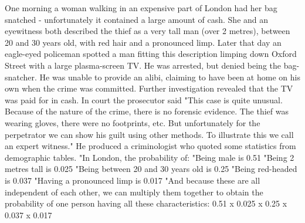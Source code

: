 One morning a woman walking in an expensive part of London had her bag snatched - unfortunately it contained a large amount of cash. She and an eyewitness both described the thief as a very tall man (over 2 metres), between 20 and 30 years old, with red hair and a pronounced limp.
Later that day an eagle-eyed policeman spotted a man fitting this description limping down Oxford Street with a large plasma-screen TV. He was arrested, but denied being the bag-snatcher. He was unable to provide an alibi, claiming to have been at home on his own when the crime was committed. Further investigation revealed that the TV was paid for in cash.
In court the prosecutor said "This case is quite unusual. Because of the nature of the crime, there is no forensic evidence. The thief was wearing gloves, there were no footprints, etc. But unfortunately for the perpetrator we can show his guilt using other methods. To illustrate this we call an expert witness."
He produced a criminologist who quoted some statistics from demographic tables. "In London, the probability of:
"Being male  is  0.51 
"Being 2 metres tall  is  0.025 
"Being between 20 and 30 years old  is  0.25 
"Being red-headed  is  0.037 
"Having a pronounced limp  is  0.017 
"And because these are all independent of each other, we can multiply them together to obtain the probability of one person having all these characteristics:
 0.51 
x  0.025 
x  0.25 
x  0.037 
x  0.017 
 

